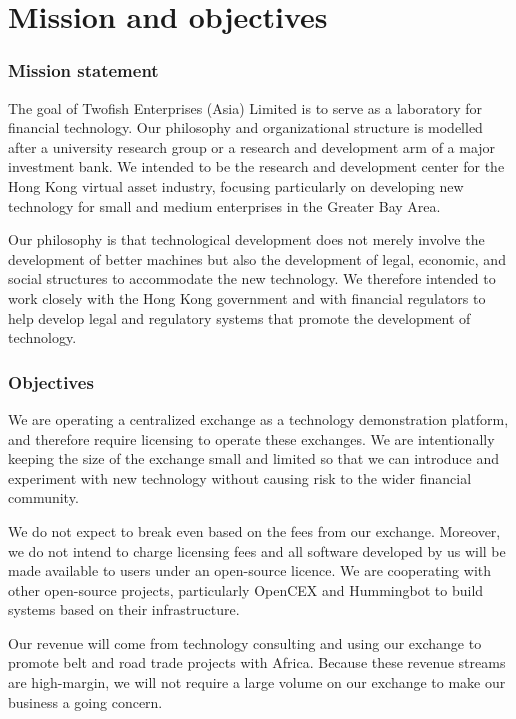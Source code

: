 \chapter{Mission and objectives}

\subsection{Mission statement}

The goal of Twofish Enterprises (Asia) Limited is to serve as
a laboratory for financial technology.  Our philosophy and
organizational structure is modelled after a university research
group or a research and development arm of a major investment bank.
We intended to be the research and development center for the Hong
Kong virtual asset industry, focusing particularly on developing new
technology for small and medium enterprises in the Greater Bay Area.

Our philosophy is that technological development does not merely
involve the development of better machines but also the development of legal,
economic, and social structures to accommodate the new technology.  We
therefore intended to work closely with the Hong Kong government and
with financial regulators to help develop legal and regulatory systems
that promote the development of technology.

\subsection{Objectives}
We are operating a centralized exchange as a technology demonstration
platform, and therefore require licensing to operate these exchanges.
We are intentionally keeping the size of the exchange small and
limited so that we can introduce and experiment with new technology
without causing risk to the wider financial community.

We do not expect to break even based on the fees from our exchange.
Moreover, we do not intend to charge licensing fees and all software
developed by us will be made available to users under an open-source
licence.  We are cooperating with other open-source projects,
particularly OpenCEX and Hummingbot to build systems based on their
infrastructure.

Our revenue will come from technology consulting and using our
exchange to promote belt and road trade projects with Africa.  Because
these revenue streams are high-margin, we will not require a large
volume on our exchange to make our business a going concern.


